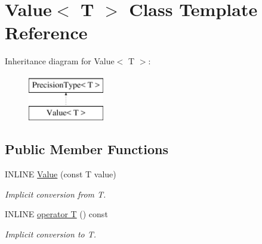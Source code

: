 \hypertarget{classValue}{}\section{Value$<$ T $>$ Class Template Reference}
\label{classValue}
Inheritance diagram for Value$<$ T $>$\+:\begin{figure}[H]
\begin{center}
\leavevmode
\includegraphics[height=2.000000cm]{classValue}
\end{center}
\end{figure}
\subsection*{Public Member Functions}
\begin{DoxyCompactItemize}
\item 
\hypertarget{classValue_a8fa393e86382288d1c64c808c460c1e2}{}\label{classValue_a8fa393e86382288d1c64c808c460c1e2} 
I\+N\+L\+I\+NE \hyperlink{classValue_a8fa393e86382288d1c64c808c460c1e2}{Value} (const T value)
\begin{DoxyCompactList}\small\item\em Implicit conversion from T. \end{DoxyCompactList}\item 
\hypertarget{classValue_a79df7aeb39e1e1456243b9c487f18823}{}\label{classValue_a79df7aeb39e1e1456243b9c487f18823} 
I\+N\+L\+I\+NE \hyperlink{classValue_a79df7aeb39e1e1456243b9c487f18823}{operator T} () const
\begin{DoxyCompactList}\small\item\em Implicit conversion to T. \end{DoxyCompactList}\end{DoxyCompactItemize}
